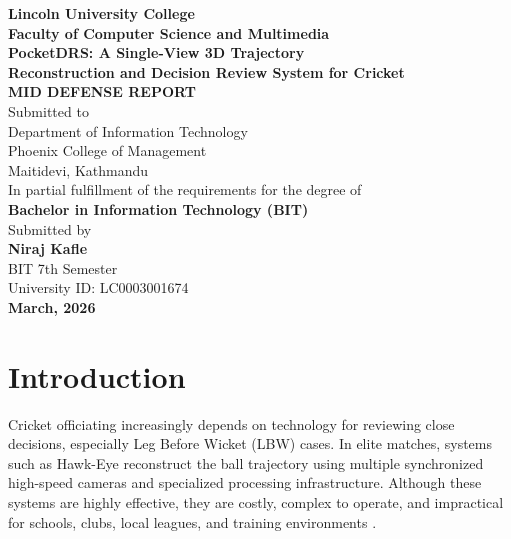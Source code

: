 \documentclass[12pt,a4paper]{article}
\begin{document}
\hypersetup{pageanchor=false}
\begin{titlepage}
\begin{center}

\textbf{\fontsize{14}{17}\selectfont Lincoln University College}\\[4pt]
\textbf{\fontsize{12}{15}\selectfont Faculty of Computer Science and Multimedia}\\[28pt]

\textbf{\fontsize{16}{19}\selectfont PocketDRS: A Single-View 3D Trajectory\\
Reconstruction and Decision Review System for Cricket}\\[24pt]

\textbf{\fontsize{14}{17}\selectfont MID DEFENSE REPORT}\\[10pt]
\fontsize{12}{15}\selectfont
Submitted to\\[4pt]
Department of Information Technology\\
Phoenix College of Management\\
Maitidevi, Kathmandu\\[20pt]

In partial fulfillment of the requirements for the degree of\\
\textbf{Bachelor in Information Technology (BIT)}\\[24pt]

Submitted by\\[8pt]
\textbf{Niraj Kafle}\\
BIT 7th Semester\\
University ID: LC0003001674\\[30pt]

\vfill
\textbf{March, 2026}

\end{center}
\end{titlepage}

\clearpage
\hypersetup{pageanchor=true}
\tableofcontents

\clearpage
{}

\section{Introduction}

Cricket officiating increasingly depends on technology for reviewing close decisions, especially Leg Before Wicket (LBW) cases. In elite matches, systems such as Hawk-Eye reconstruct the ball trajectory using multiple synchronized high-speed cameras and specialized processing infrastructure. Although these systems are highly effective, they are costly, complex to operate, and impractical for schools, clubs, local leagues, and training environments \cite{hawkeye2024}.
\end{document}
